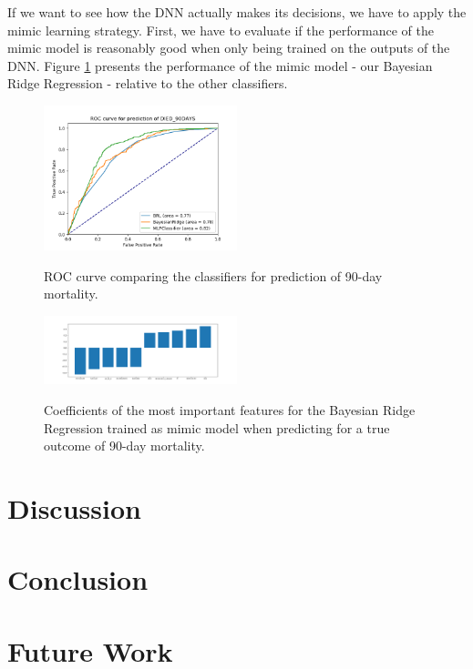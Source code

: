 \documentclass[conference,compsoc]{IEEEtran}
\begin{document}
If we want to see how the DNN actually makes its decisions, we have to apply the mimic learning strategy.
First, we have to evaluate if the performance of the mimic model is reasonably good when only being trained on the outputs of the DNN.
Figure \ref{fig:mortalityROC} presents the performance of the mimic model - our Bayesian Ridge Regression - relative to the other classifiers.


\begin{figure}[h]
	\includegraphics[width=0.5\textwidth]{ROC_DIED_90DAYS.png}
	\label{fig:mortalityROC}
	\caption{ROC curve comparing the classifiers for prediction of 90-day mortality.}
\end{figure}

\begin{figure}[h]
	\includegraphics[width=0.5\textwidth]{coef_DIED_90DAYS.png}
	\label{fig:mortalityCOEF}
	\caption{Coefficients of the most important features for the Bayesian Ridge Regression trained as mimic model when predicting for a true outcome of 90-day mortality.}
\end{figure}

\section{Discussion}


\section{Conclusion}


\section{Future Work}





\end{document}
